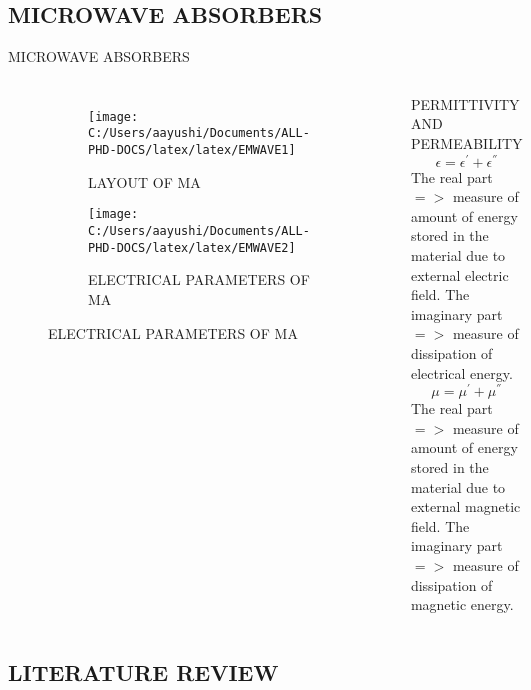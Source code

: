 \documentclass[11pt,aspect ratio=169]{beamer}
\begin{document}
\subsection{MICROWAVE ABSORBERS}
\begin{frame}{MICROWAVE ABSORBERS}
	
	\begin{columns}
		
		\begin{figure}[ht]
			\begin{subfigure}{0.8\textwidth}
				\texttt{[image: C:/Users/aayushi/Documents/ALL-PHD-DOCS/latex/latex/EMWAVE1]}
				\caption{ LAYOUT OF MA}
				\label{fig:emwave1}
			\end{subfigure}
			\begin{subfigure}{0.8\textwidth}	
				\texttt{[image: C:/Users/aayushi/Documents/ALL-PHD-DOCS/latex/latex/EMWAVE2]}
				\caption{ELECTRICAL PARAMETERS OF MA}
				\label{fig:emwave2}
			\end{subfigure}
		\end{figure}
		\begin{block}{PERMITTIVITY AND PERMEABILITY}
			\begin{equation}
			\epsilon={\epsilon}^{'} +{\epsilon}^{''}
			\end{equation}
			The real part $=>$ measure of amount of energy stored in the material due to external electric field.
			The imaginary part $=>$ measure of dissipation of electrical energy.
			\begin{equation}
			\mu={\mu}^{'} +{\mu}^{''}
			\end{equation}
			The real part $=>$ measure of amount of energy stored in the material due to external magnetic field.
			The imaginary part $=>$ measure of dissipation of magnetic energy.	
		\end{block}
	\end{columns}
	\subsection{LITERATURE REVIEW}
\end{frame}
\end{document}
